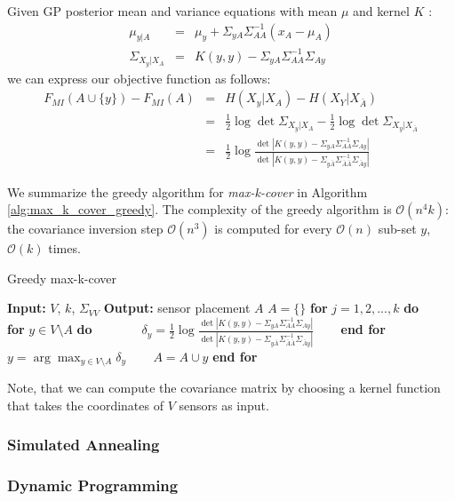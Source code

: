 Given GP posterior mean and variance equations with mean $\mu$ and kernel $K$ \cite{MurphyML}:
\begin{eqnarray}
   \mu_{y|A} &=& \mu_y + \Sigma_{yA}\Sigma_{AA}^{-1}(x_A - \mu_A) \\
   \Sigma_{X_y|X_A} &=& K(y,y) - \Sigma_{yA}\Sigma_{AA}^{-1}\Sigma_{Ay}
\end{eqnarray}
we can express our objective function as follows:
\begin{eqnarray}
   F_{MI}(A\cup \{y\}) - F_{MI}(A) &=& H(X_y|X_A) - H(X_Y|X_{\bar{A}}) \nonumber\\
   &=&\frac{1}{2}\log \det \Sigma_{X_y|X_A} - \frac{1}{2}\log \det \Sigma_{X_y|X_{\bar{A}}} \nonumber \\
   &=&\frac{1}{2}\log \frac{\det |K(y,y) - \Sigma_{yA}\Sigma_{AA}^{-1}\Sigma_{Ay}|}{\det |K(y,y)-\Sigma_{y\bar{A}}\Sigma_{\bar{A}\bar{A}}^{-1}\Sigma_{\bar{A}y}|}
\end{eqnarray}

We summarize the greedy algorithm for \textit{max-k-cover} in Algorithm \ref{alg:max_k_cover_greedy}. The complexity of the greedy algorithm is $\mathcal{O}(n^4 k)$: the covariance inversion step $\mathcal{O}(n^3)$ is computed for every $\mathcal{O}(n)$ sub-set $y$, $\mathcal{O}(k)$ times.
\begin{algorithm}[t]
\caption{Greedy max-k-cover}
\label{alg:max_k_cover_greedy}
\begin{algorithmic}[1]
\STATE \textbf{Input:} $V$, $k$, $\Sigma_{VV}$ 
\STATE \textbf{Output:} sensor placement $A$ 
\STATE $A=\{\}$
\STATE \textbf{for} $j = 1,2,...,k$ \textbf{do}
\STATE ~~~ \textbf{for} $y \in V\setminus A$ \textbf{do}
\STATE ~~~ ~~~ $\delta_y = \frac{1}{2}\log \frac{\det |K(y,y) - \Sigma_{yA}\Sigma_{AA}^{-1}\Sigma_{Ay}|}{\det |K(y,y)-\Sigma_{y\bar{A}}\Sigma_{\bar{A}\bar{A}}^{-1}\Sigma_{\bar{A}y}|}$
\STATE ~~~ \textbf{end for}
\STATE ~~~ $y = \arg \max_{y \in V\setminus A}\delta_y$ 
\STATE ~~~ $A = A \cup {y}$
\STATE \textbf{end for}
\end{algorithmic}
\end{algorithm}
Note, that we can compute the covariance matrix by choosing a kernel function that takes the coordinates of $V$ sensors as input.

\subsubsection{Simulated Annealing}

\subsubsection{Dynamic Programming}






